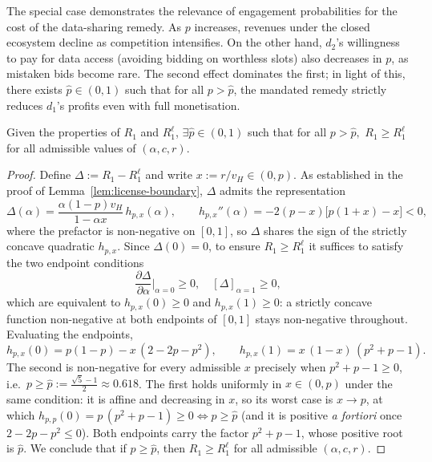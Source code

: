 \noindent The special case demonstrates the relevance of engagement probabilities for the cost of the data-sharing remedy. As $p$ increases, revenues under the closed ecosystem decline as competition intensifies. On the other hand, $d_2$'s willingness to pay for data access (avoiding bidding on worthless slots) also decreases in $p$, as mistaken bids become rare. The second effect dominates the first; in light of this, there exists $\hat{p} \in (0,1)$ such that for all $p > \hat{p}$, the mandated remedy strictly reduces $d_1$'s profits even with full monetisation.

\begin{prop}\label{always-license}
    Given the properties of $R_1$ and $R_1^\ell$, $\exists \hat{p} \in (0,1)$ such that for all $p > \hat{p},$ $R_1 \geq R_1^\ell$ for all admissible values of $(\alpha, c,r)$.
\end{prop}
\begin{proof}
    Define $\Delta := R_1 - R_1^\ell$ and write $x := r/v_H \in (0,p)$. As established in the proof of Lemma~\ref{lem:license-boundary}, $\Delta$ admits the representation
\begin{equation*}
    \Delta(\alpha) = \frac{\alpha (1-p) v_H}{1-\alpha x}\, h_{p,x}(\alpha), \qquad h_{p,x}''(\alpha) = -2(p-x)\big[p(1+x)-x\big] < 0,
\end{equation*}
where the prefactor is non-negative on $[0,1]$, so $\Delta$ shares the sign of the strictly concave quadratic $h_{p,x}$. Since $\Delta(0)=0$, to ensure $R_1 \geq R_1^\ell$ it suffices to satisfy the two endpoint conditions
\begin{equation*}
    \frac{\partial \Delta}{\partial \alpha} \bigg|_{\alpha = 0}\geq0, \quad \left[\Delta\right]_{\alpha = 1} \geq 0,
\end{equation*}
which are equivalent to $h_{p,x}(0)\geq 0$ and $h_{p,x}(1)\geq 0$: a strictly concave function non-negative at both endpoints of $[0,1]$ stays non-negative throughout. Evaluating the endpoints,
\begin{equation*}
    h_{p,x}(0) = p(1-p) - x\,(2-2p-p^2), \qquad h_{p,x}(1) = x\,(1-x)\,(p^2+p-1).
\end{equation*}
The second is non-negative for every admissible $x$ precisely when $p^2+p-1 \geq 0$, i.e.\ $p \geq \hat{p} := \frac{\sqrt{5}-1}{2} \approx 0.618$. The first holds uniformly in $x\in(0,p)$ under the same condition: it is affine and decreasing in $x$, so its worst case is $x \to p$, at which $h_{p,p}(0) = p\,(p^2+p-1) \geq 0 \iff p \geq \hat{p}$ (and it is positive \emph{a fortiori} once $2-2p-p^2\leq 0$). Both endpoints carry the factor $p^2+p-1$, whose positive root is $\hat{p}$. We conclude that if $p \geq \hat{p}$, then $R_1 \geq R_1^\ell$ for all admissible $(\alpha, c, r)$.
\end{proof}

